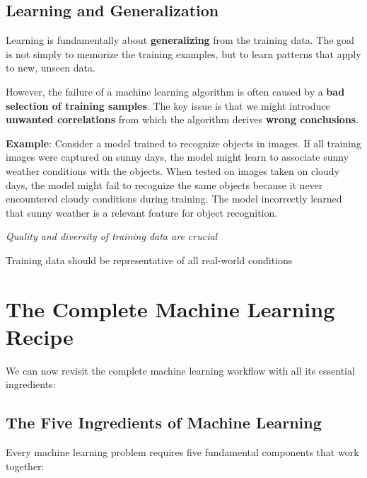 \documentclass[11pt,a4paper]{article}
\theoremstyle{definition}
\theoremstyle{plain}
\theoremstyle{remark}
\begin{document}
\subsection{Learning and Generalization}

Learning is fundamentally about \textbf{generalizing} from the training data. The goal is not simply to memorize the training examples, but to learn patterns that apply to new, unseen data.

However, the failure of a machine learning algorithm is often caused by a \textbf{bad selection of training samples}. The key issue is that we might introduce \textbf{unwanted correlations} from which the algorithm derives \textbf{wrong conclusions}.

\textbf{Example}: Consider a model trained to recognize objects in images. If all training images were captured on sunny days, the model might learn to associate sunny weather conditions with the objects. When tested on images taken on cloudy days, the model might fail to recognize the same objects because it never encountered cloudy conditions during training. The model incorrectly learned that sunny weather is a relevant feature for object recognition.

\begin{tcolorbox}[colback=blue!5!white,colframe=blue!75!black]
\begin{center}
\textit{Quality and diversity of training data are crucial}

Training data should be representative of all real-world conditions
\end{center}
\end{tcolorbox}

\section{The Complete Machine Learning Recipe}

We can now revisit the complete machine learning workflow with all its essential ingredients:

\subsection{The Five Ingredients of Machine Learning}

Every machine learning problem requires five fundamental components that work together:
\end{document}

